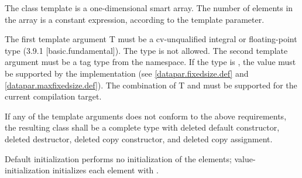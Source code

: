 

\pnum The class template \datapar{} is a one-dimensional smart array.
The number of elements in the array is a constant expression, according to the  template parameter.

\pnum\label{datapar.type requirements}%
The first template argument \type T must be a cv-unqualified integral or floating-point type (3.9.1 [basic.fundamental]).
The type \bool is not allowed.
The second template argument  must be a tag type from the  namespace.
If the  type is \fixedsizeN, the value  must be supported by the implementation (see \ref{datapar.fixedsize.def} and \ref{datapar.maxfixedsize.def}).
The combination of \type T and  must be supported for the current compilation target.


\pnum\label{datapar.deleted}%
If any of the template arguments does not conform to the above requirements, the resulting class shall be a complete type with deleted default constructor, deleted destructor, deleted copy constructor, and deleted copy assignment.

\pnum Default initialization performs no initialization of the elements; value-initialization initializes each element with .

